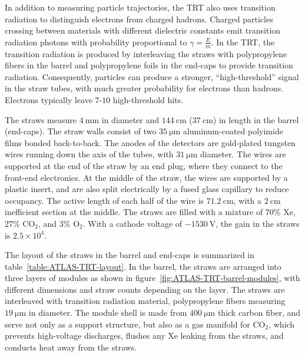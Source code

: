 In addition to measuring particle trajectories, the TRT also uses transition radiation to distinguish electrons from charged hadrons. Charged particles crossing between materials with different dielectric constants emit transition radiation photons with probability proportional to $\gamma=\frac{E}{m}$. In the TRT, the transition radiation is produced by interleaving the straws with polypropylene fibers in the barrel and polypropylene foils in the end-caps to provide transition radiation. Consequently, particles can produce a stronger, ``high-threshold'' signal in the straw tubes, with much greater probability for electrons than hadrons.  Electrons typically leave $7$-$10$ high-threshold hits. 

The straws measure $\SI{4}{\milli\meter}$ in diameter and $\SI{144}{\centi\meter}$ ($\SI{37}{\centi\meter}$) in length in the barrel (end-caps). The straw walls consist of two $\SI{35}{\micro\meter}$ aluminum-coated polyimide films bonded back-to-back.
The anodes of the detectors are gold-plated tungsten wires running down the axis of the tubes, with $\SI{31}{\micro\meter}$ diameter.
The wires are supported at the end of the straw by an end plug, where they connect to the front-end electronics. At the middle of the straw, the wires are supported by a plastic insert, and are also split electrically by a fused glass capillary to reduce occupancy. The active length of each half of the wire is $\SI{71.2}{\centi\meter}$, with a $\SI{2}{\centi\meter}$ inefficient section at the middle. 
The straws are filled with a mixture of 70\% Xe, 27\% CO$_2$, and $3\%$ O$_2$. With a cathode voltage of $\SI{-1530}{\volt}$, the gain in the straws is $2.5\times 10^4$.

The layout of the straws in the barrel and end-caps is summarized in table~\ref{table:ATLAS-TRT-layout}. In the barrel, the straws are arranged into three layers of modules as shown in figure~\ref{fig:ATLAS-TRT-barrel-modules}, with different dimensions and straw counts depending on the layer. The straws are interleaved with transition radiation material, polypropylene fibers measuring $\SI{19}{\micro\meter}$ in diameter. The module shell is made from $\SI{400}{\micro\meter}$ thick carbon fiber, and serve not only as a support structure, but also as a gas manifold for CO$_2$, which prevents high-voltage discharges, flushes any Xe leaking from the straws, and conducts heat away from the straws.  

